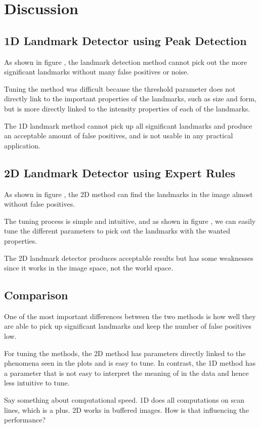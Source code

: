 \chapter{Discussion}

\section{1D Landmark Detector using Peak Detection}

As shown in figure , the landmark detection method cannot pick out the more significant landmarks without many false positives or noise. 

Tuning the method was difficult because the threshold parameter does not directly link to the important properties of the landmarks, such as size and form, but is more directly linked to the intensity properties of each of the landmarks. 

The 1D landmark method cannot pick up all significant landmarks and produce an acceptable amount of false positives, and is not usable in any practical application.

\section{2D Landmark Detector using Expert Rules}

As shown in figure , the 2D method can find the landmarks in the image almost without false positives.

The tuning process is simple and intuitive, and as shown in figure , we can easily tune the different parameters to pick out the landmarks with the wanted properties. 

The 2D landmark detector produces acceptable results but has some weaknesses since it works in the image space, not the world space. 


\section{Comparison}

One of the most important differences between the two methods is how well they are able to pick up significant landmarks and keep the number of false positives low. 

For tuning the methods, the 2D method has parameters directly linked to the phenomena seen in the plots and is easy to tune. In contrast, the 1D method has a parameter that is not easy to interpret the meaning of in the data and hence less intuitive to tune.

Say something about computational speed. 1D does all computations on scan lines, which is a plus. 2D works in buffered images. How is that influencing the performance?